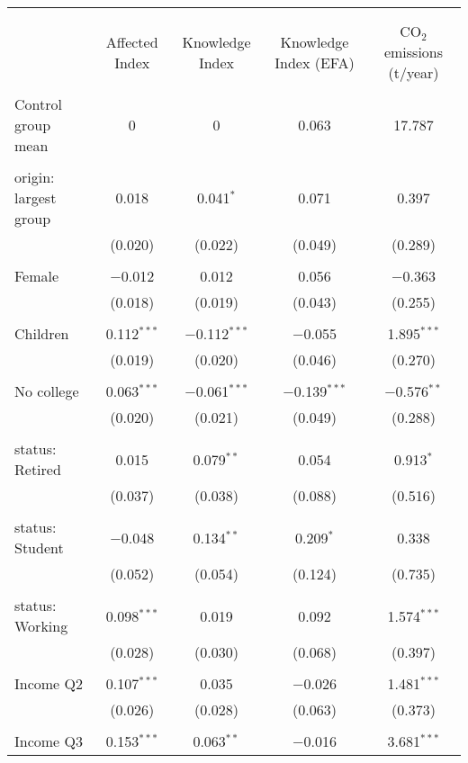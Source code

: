 
\begin{tabular}{@{\extracolsep{5pt}}lcccc} 
\\[-1.8ex]\hline 
\hline \\[-1.8ex] 
\\[-1.8ex] & Affected Index & Knowledge Index & Knowledge Index (EFA) & CO$_{2}$ emissions (t/year) \\ 
\hline \\[-1.8ex] 
 Control group mean & 0 & 0 & 0.063 & 17.787  \\ \hline \\[-1.8ex] origin: largest group & 0.018 & 0.041$^{*}$ & 0.071 & 0.397 \\ 
  & (0.020) & (0.022) & (0.049) & (0.289) \\ 
  & & & & \\ 
 Female & $-$0.012 & 0.012 & 0.056 & $-$0.363 \\ 
  & (0.018) & (0.019) & (0.043) & (0.255) \\ 
  & & & & \\ 
 Children & 0.112$^{***}$ & $-$0.112$^{***}$ & $-$0.055 & 1.895$^{***}$ \\ 
  & (0.019) & (0.020) & (0.046) & (0.270) \\ 
  & & & & \\ 
 No college & 0.063$^{***}$ & $-$0.061$^{***}$ & $-$0.139$^{***}$ & $-$0.576$^{**}$ \\ 
  & (0.020) & (0.021) & (0.049) & (0.288) \\ 
  & & & & \\ 
 status: Retired & 0.015 & 0.079$^{**}$ & 0.054 & 0.913$^{*}$ \\ 
  & (0.037) & (0.038) & (0.088) & (0.516) \\ 
  & & & & \\ 
 status: Student & $-$0.048 & 0.134$^{**}$ & 0.209$^{*}$ & 0.338 \\ 
  & (0.052) & (0.054) & (0.124) & (0.735) \\ 
  & & & & \\ 
 status: Working & 0.098$^{***}$ & 0.019 & 0.092 & 1.574$^{***}$ \\ 
  & (0.028) & (0.030) & (0.068) & (0.397) \\ 
  & & & & \\ 
 Income Q2 & 0.107$^{***}$ & 0.035 & $-$0.026 & 1.481$^{***}$ \\ 
  & (0.026) & (0.028) & (0.063) & (0.373) \\ 
  & & & & \\ 
 Income Q3 & 0.153$^{***}$ & 0.063$^{**}$ & $-$0.016 & 3.681$^{***}$ \\ 

\end{tabular}
